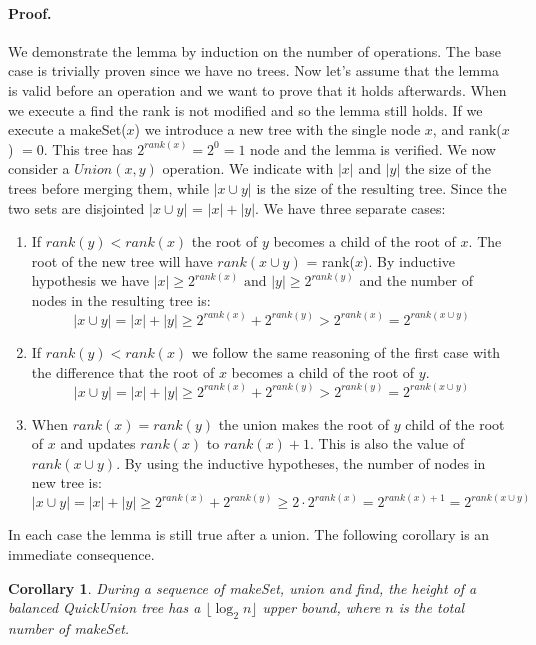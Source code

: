 \documentclass{article}
\newtheorem{corollary}{Corollary}
\begin{document}
\paragraph{\textbf{Proof.}} We demonstrate the lemma by induction on the number of operations. The base case is trivially proven
since we have no trees. Now let's assume that the lemma is valid before an operation and we want to prove that it holds afterwards. When we execute  a find the rank is not modified and so the lemma still holds.
If we execute a makeSet($x$) we introduce a new tree with the single node $x$, and rank($x$) $ = 0$.
This tree has $2^{rank(x)} = 2^0 = 1$ node  and the lemma is verified. We now consider a $Union(x, y)$ operation.
We indicate with $|x|$ and $|y|$ the size of the trees before merging them, while $|x \cup y|$ is the size of the resulting tree. Since the two sets are disjointed
$|x \cup y|$ = $|x| + |y|$.
We have three separate cases:\begin{enumerate}
    \item If $rank(y) < rank(x)$ the root of $y$ becomes a child of the root of $x$. The root of the new tree will have $rank(x \cup y)$ = rank($x$). 
    By inductive hypothesis we have $|x| \geq 2^{rank(x)}\text{ and }|y| \geq 2^{rank(y)}$ and the number
    of nodes in the resulting tree is:
    $$ |x\cup y| = |x| + |y| \geq 2^{rank(x)} + 2^{rank(y)} > 2^{rank(x)} = 2^{rank(x \cup y)} $$
    \item If $rank(y) < rank(x)$ we follow the same reasoning of the first case with the difference that
    the root of $x$ becomes a child of the root of $y$.
    $$ |x\cup y| = |x| + |y| \geq 2^{rank(x)} + 2^{rank(y)} > 2^{rank(y)} = 2^{rank(x \cup y)} $$
    \item When $rank(x) = rank(y)$ the union makes the root of $y$ child of the root of $x$ and updates $rank(x)$ to $rank(x) + 1$. This is also the value of $rank(x\cup y)$.
    By using the inductive hypotheses, the number of nodes in new tree is:
    $$  |x\cup y| = |x| + |y| \geq 2^{rank(x)} + 2^{rank(y)} \geq 2\cdot2^{rank(x)} = 2^{rank(x) + 1} = 2^{rank(x \cup y)} $$
\end{enumerate}
In each case the lemma is still true after a union. The following corollary is an immediate consequence.
\begin{corollary}
    During a sequence of makeSet, union and find, the height of a balanced QuickUnion tree has a $\lfloor \log_2 n \rfloor$ upper bound, where $n$
    is the total number of makeSet.
\end{corollary}
\end{document}
